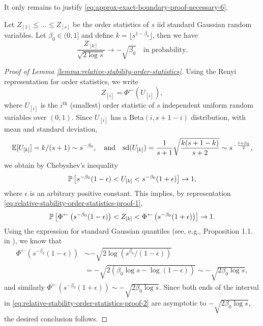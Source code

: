 It only remains to justify \eqref{eq:approx-exact-boundary-proof-necessary-6}.

\begin{lemma}
\label{lemma:relative-stability-order-statistics}
Let $Z_{[1]} \le \ldots \le Z_{[s]}$ be the order statistics of $s$ iid standard Gaussian random variables.
Let $\beta_0\in(0,1]$ and define $k=\lfloor s^{1-\beta_0}\rfloor$, then we have
\begin{equation}
    \frac{Z_{[k]}}{\sqrt{2\log{s}}} \to -\sqrt{\beta_0} \quad\text{in probability}.
\end{equation}
\end{lemma}

\begin{proof}[Proof of Lemma \ref{lemma:relative-stability-order-statistics}]
Using the Renyi representation for order statistics, we write
\begin{equation} \label{eq:relative-stability-order-statistics-proof-1}
    Z_{[i]} = \Phi^{\leftarrow}(U_{[i]}),
\end{equation}
where $U_{[i]}$ is the $i^\mathrm{th}$ (smallest) order statistic of $s$ independent uniform random variables over $(0,1)$.
Since $U_{[i]}$ has a $\mathrm{Beta}(i, s+1-i)$ distribution, with mean and standard deviation,
$$
\E[U_{[k]}] = k/(s+1) \sim s^{-\beta_0}, 
\quad \text{and} \quad
{\mathrm{sd}(U_{[k]})} = \frac{1}{s+1}\sqrt{\frac{k(s+1-k)}{s+2}} \sim s^{-\frac{1+\beta_0}{2}},
$$
we obtain by Chebyshev's inequality 
$$
\P\left[s^{-\beta_0}(1-\epsilon) < U_{[k]} < s^{-\beta_0}(1+\epsilon)\right] \to 1,
$$
where $\epsilon$ is an arbitrary positive constant.
This implies, by representation \eqref{eq:relative-stability-order-statistics-proof-1},
\begin{equation} \label{eq:relative-stability-order-statistics-proof-2}
    \P\left[\Phi^{\leftarrow}\left(s^{-\beta_0}(1-\epsilon)\right) < Z_{[k]} < \Phi^{\leftarrow}\left(s^{-\beta_0}(1+\epsilon)\right)\right] \to 1.
\end{equation}
Using the expression for standard Gaussian quantiles (see, e.g., Proposition 1.1. in \cite{gao2018fundamental}), we know that
\begin{align*}
    \Phi^{\leftarrow}\left(s^{-\beta_0}(1-\epsilon)\right) 
    &\sim -\sqrt{2\log{\left(s^{\beta_0}/(1-\epsilon)\right)}} \\
    &= -\sqrt{2(\beta_0\log{s} - \log{(1-\epsilon)})} \sim -\sqrt{2\beta_0\log{s}},
\end{align*}
and similarly $\Phi^{\leftarrow}\left(s^{-\beta_0}(1+\epsilon)\right)\sim -\sqrt{2\beta_0\log{s}}$.
Since both ends of the interval in \eqref{eq:relative-stability-order-statistics-proof-2} are asymptotic to $-\sqrt{2\beta_0\log{s}}$, 
the desired conclusion follows.
\end{proof}



